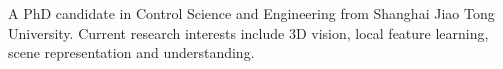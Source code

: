 

\begin{cvparagraph}

A PhD candidate in Control Science and Engineering from Shanghai Jiao Tong University. Current research interests include 3D vision, local feature learning, scene representation and understanding. 
\end{cvparagraph}